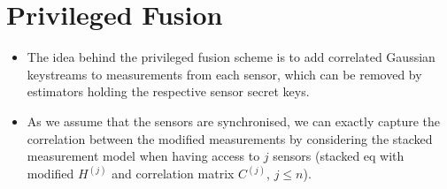 \documentclass[conference]{IEEEtran}
\begin{document}
% 
%                                                                      
%                                                                      
%                                                                      
% 

\section{Privileged Fusion}\label{sec:scheme}
\begin{itemize}
  \item The idea behind the privileged fusion scheme is to add correlated Gaussian keystreams to measurements from each sensor, which can be removed by estimators holding the respective sensor secret keys.
  \item As we assume that the sensors are synchronised, we can exactly capture the correlation between the modified measurements by considering the stacked measurement model when having access to $j$ sensors (stacked eq with modified $H^{(j)}$ and correlation matrix $C^{(j)}$, $j\leq n$).
\end{itemize}
\end{document}
